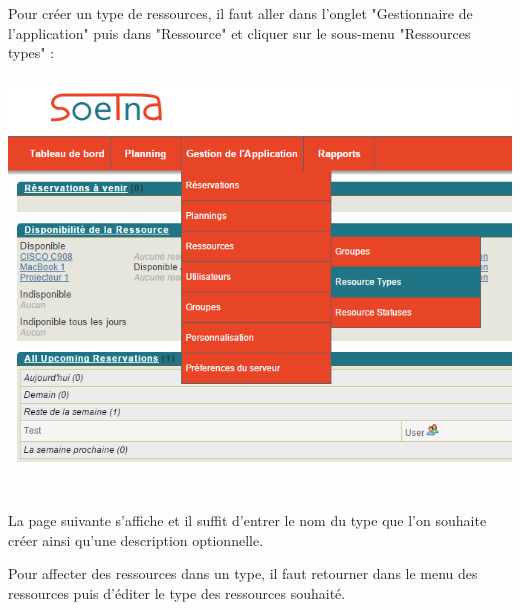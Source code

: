\documentclass[a4paper,11pt]{article}
\begin{document}
Pour créer un type de ressources, il faut aller dans l'onglet "Gestionnaire de l'application" puis dans "Ressource" et cliquer sur le sous-menu "Ressources types" :

\vspace{1 cm}

\begin{center}
\includegraphics[height=11cm]{./grp1.PNG}
\end{center}

\vspace{1 cm}

La page suivante s'affiche et il suffit d'entrer le nom du type que l'on souhaite créer ainsi qu'une description optionnelle.

Pour affecter des ressources dans un type, il faut retourner dans le menu des ressources puis d'éditer le type des ressources souhaité.
\end{document}
